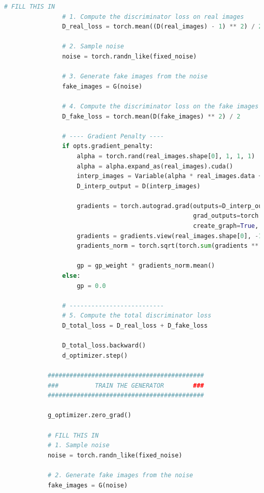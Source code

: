 \documentclass{article}
\begin{document}
\begin{lstlisting}[language=python]
                # FILL THIS IN
                # 1. Compute the discriminator loss on real images
                D_real_loss = torch.mean((D(real_images) - 1) ** 2) / 2

                # 2. Sample noise
                noise = torch.randn_like(fixed_noise)

                # 3. Generate fake images from the noise
                fake_images = G(noise)
                
                # 4. Compute the discriminator loss on the fake images
                D_fake_loss = torch.mean(D(fake_images) ** 2) / 2

                # ---- Gradient Penalty ----
                if opts.gradient_penalty:
                    alpha = torch.rand(real_images.shape[0], 1, 1, 1)
                    alpha = alpha.expand_as(real_images).cuda()
                    interp_images = Variable(alpha * real_images.data + alpha * fake_images.data, requires_grad=True).cuda()
                    D_interp_output = D(interp_images)

                    gradients = torch.autograd.grad(outputs=D_interp_output, inputs=interp_images,
                                                    grad_outputs=torch.ones(D_interp_output.size()).cuda(),
                                                    create_graph=True, retain_graph=True)[0]
                    gradients = gradients.view(real_images.shape[0], -1)
                    gradients_norm = torch.sqrt(torch.sum(gradients ** 2, dim=1) + 1e-12)

                    gp = gp_weight * gradients_norm.mean()
                else:
                    gp = 0.0

                # --------------------------
                # 5. Compute the total discriminator loss
                D_total_loss = D_real_loss + D_fake_loss

                D_total_loss.backward()
                d_optimizer.step()

            ###########################################
            ###          TRAIN THE GENERATOR        ###
            ###########################################

            g_optimizer.zero_grad()

            # FILL THIS IN
            # 1. Sample noise
            noise = torch.randn_like(fixed_noise)

            # 2. Generate fake images from the noise
            fake_images = G(noise)


\end{lstlisting}
\end{document}
